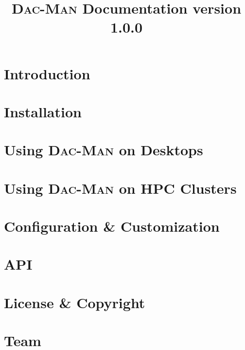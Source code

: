 \documentclass[oneside,11pt]{memoir}
\newcommand{\systemname}{\textsc{Dac}-\textsc{Man}\xspace}
\begin{document}
\title{\Huge \systemname Documentation \newline\newline \Large version 1.0.0}

\maketitle

\newpage

\tableofcontents*

\chapter{Introduction}
\label{ch:intro}


\chapter{Installation}
\label{ch:install}


\chapter{Using \systemname on Desktops}
\label{ch:desktop}


\chapter{Using \systemname on HPC Clusters}
\label{ch:hpc}


\chapter{Configuration \& Customization}
\label{ch:config}


\chapter{API}
\label{ch:api}

%

\chapter{License \& Copyright}
\label{ch:license}


\chapter{Team}
\label{ch:team}

\end{document}
